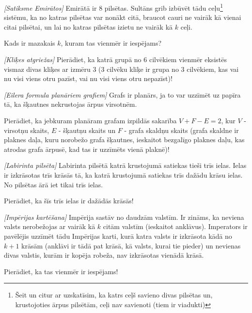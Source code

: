 

%



\noindent 


\begin{problem}
\textit{[Satiksme Emirātos]}
Emirātā ir $8$ pilsētas. Sultāns grib izbūvēt tādu ceļu\footnote{Šeit un citur ar uzskatīsim, ka katrs ceļš savieno divas pilsētas un, krustojoties ārpus pilsētām, ceļi nav savienoti (tiem ir viadukti)} sistēmu, ka no katras pilsētas var nonākt citā, braucot cauri ne vairāk kā vienai citai pilsētai, un lai no katras pilsētas izietu ne vairāk kā $k$ ceļi. 

Kads ir mazakais $k$, kuram tas vienmēr ir iespējams?

\end{problem}
%

\begin{problem}
\textit{[Kliķes atgriežas]}
Pierādiet, ka katrā grupā no $6$ cilvēkiem vienmēr eksistēs vismaz divas kliķes ar izmēru $3$ ($3$ cilvēku kliķe ir grupa no $3$ cilvēkiem, kas vai nu visi viens otru pazīst, vai nu visi viens otru nepazīst)!
\end{problem}
%

\begin{problem}
\textit{[Eilera formula planāriem grafiem]}
Grafs ir planārs, ja to var uzzīmēt uz papīra tā, ka šķautnes nekrustojas ārpus virsotnēm. 

Pierādiet, ka jebkuram planāram grafam izpildās sakarība $V+F-E=2$, kur $V$ - virsotņu skaits, $E$ - šķautņu skaits un $F$ - grafa skaldņu skaits (grafa skaldne ir plaknes daļa, kuru norobežo grafa šķautnes, ieskaitot bezgalīgo plaknes daļu, kas atrodas grafa ārpusē, kad tas ir uzzīmēts vienā plaknē)!
\end{problem}


\begin{problem}
\textit{[Labirinta pilsēta]}
Labirinta pilsētā katrā krustojumā satiekas tieši trīs ielas. Ielas ir izkrāsotas trīs krāsās tā, ka katrā krustojumā satiekas trīs dažādu krāsu ielas. No pilsētas ārā iet tikai trīs ielas. 

Pierādiet, ka šīs trīs ielas ir dažādās krāsās!
\end{problem}
%

\begin{problem}
\textit{[Impērijas kartēšana]}
Impērija sastāv no daudzām valstīm. Ir zināms, ka neviena valsts nerobežojas ar vairāk kā $k$ citām valstīm (ieskaitot anklāvus). Imperators ir pavēlējis uzzīmēt tādu Impērijas karti, kurā katra valsts ir izkrāsota kādā no $k+1$ krāsām (anklāvi ir tādā pat krāsā, kā valsts, kurai tie pieder) un nevienas divas valstis, kurām ir kopēja robeža, nav izkrāsotas vienādā krāsā. 

Pierādiet, ka tas vienmēr ir iespējams!

\end{problem}
%

